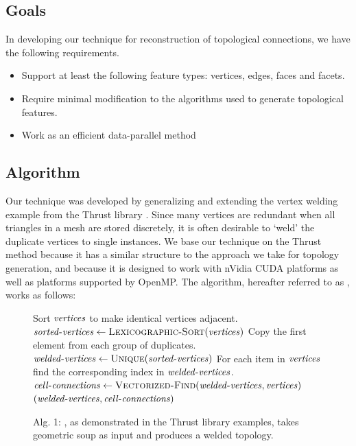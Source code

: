 \documentclass[review,journal]{vgtc}         %
\begin{document}
\subsection{Goals}
In developing our technique for reconstruction of topological connections, we have the
following requirements.
\begin{itemize}
	\item{Support at least the following feature types: vertices, edges, faces and facets.}

	\item{Require minimal modification to the algorithms used to generate topological features.}

	\item{Work as an efficient data-parallel method}
 
\end{itemize}

\subsection{Algorithm}
Our technique was developed by generalizing and extending the vertex welding example from the Thrust library \cite{Bell2012}.
Since many vertices are redundant when all triangles in a mesh are stored discretely, it is often desirable to
`weld' the duplicate vertices to single instances. We base our technique on the Thrust method because it has a similar
structure to the approach we take for topology generation, and because it is designed to work with nVidia CUDA platforms as well as platforms supported by OpenMP. The algorithm, hereafter referred to as , works as follows:
\begin{figure}
\vspace{-0.3cm}
\begin{codebox}
  \zi \Comment Sort $\id{vertices}$ to make identical vertices adjacent.
  \li $\id{sorted-vertices} \gets \proc{Lexicographic-Sort}(\id{vertices})$
  \zi \Comment Copy the first element from each group of duplicates.
  \li $\id{welded-vertices} \gets \proc{Unique}(\id{sorted-vertices})$
  \zi \Comment For each item in $\id{vertices}$ find the corresponding index
  \zi \Comment in $\id{welded-vertices}$.
  \li $\id{cell-connections} \gets \proc{Vectorized-Find}(\id{welded-vertices},\id{vertices})$
  \li \Return $( \id{welded-vertices}, \id{cell-connections} )$
\end{codebox}
\vspace{-0.5cm}
\caption*{Alg. 1: , as demonstrated in the Thrust library examples, takes geometric soup as input and produces a welded topology.}
\end{figure}
\end{document}
